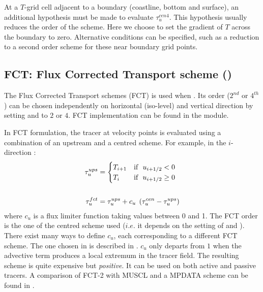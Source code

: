 \documentclass[../main/NEMO_manual]{subfiles}
\begin{document}
At a $T$-grid cell adjacent to a boundary (coastline, bottom and surface),
an additional hypothesis must be made to evaluate $\tau_u^{cen4}$.
This hypothesis usually reduces the order of the scheme.
Here we choose to set the gradient of $T$ across the boundary to zero.
Alternative conditions can be specified, such as a reduction to a second order scheme for
these near boundary grid points.

\subsection{FCT: Flux Corrected Transport scheme (\protect{})}
\label{subsec:TRA_adv_tvd}

The Flux Corrected Transport schemes (FCT) is used when .
Its order ($2^{nd}$ or $4^{th}$) can be chosen independently on horizontal (iso-level) and vertical direction by
setting  and  to $2$ or $4$.
FCT implementation can be found in the  module.

In FCT formulation, the tracer at velocity points is evaluated using a combination of an upstream and
a centred scheme.
For example, in the $i$-direction :
\begin{equation}
  \label{eq:tra_adv_fct}
  \begin{split}
    \tau_u^{ups}&=
    \begin{cases}
      T_{i+1} 	& \text{if $\ u_{i+1/2} <     0$} \hfill \\
      T_i   		& \text{if $\ u_{i+1/2} \geq 0$} \hfill \\
    \end{cases}
    \\ \\
    \tau_u^{fct}&=\tau_u^{ups} +c_u \;\left( {\tau_u^{cen} -\tau_u^{ups} } \right)
  \end{split}
\end{equation}
where $c_u$ is a flux limiter function taking values between 0 and 1.
The FCT order is the one of the centred scheme used
($i.e.$ it depends on the setting of  and ).
There exist many ways to define $c_u$, each corresponding to a different FCT scheme.
The one chosen in \NEMO is described in \citet{Zalesak_JCP79}.
$c_u$ only departs from $1$ when the advective term produces a local extremum in the tracer field.
The resulting scheme is quite expensive but \emph{positive}.
It can be used on both active and passive tracers.
A comparison of FCT-2 with MUSCL and a MPDATA scheme can be found in \citet{Levy_al_GRL01}.
\end{document}
